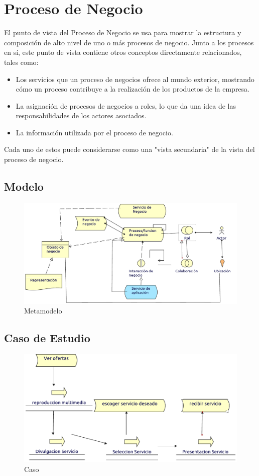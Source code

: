 \section{Proceso de Negocio}
El punto de vista del Proceso de Negocio se usa para mostrar la estructura y composición de alto nivel de uno o más procesos de negocio. Junto a los procesos en sí, este punto de vista contiene otros conceptos directamente relacionados, tales como:
\begin{itemize}
\item Los servicios que un proceso de negocios ofrece al mundo exterior, mostrando cómo un proceso contribuye a la realización de los productos de la empresa.
\item La asignación de procesos de negocios a roles, lo que da una idea de las responsabilidades de los actores asociados.
\item La información utilizada por el proceso de negocio. 
\end{itemize}
Cada uno de estos puede considerarse como una "vista secundaria" de la vista del proceso de negocio.
\subsection{Modelo}
\begin{figure}[h!]
	\centering
	\includegraphics[width=\linewidth]{Arquitectura/Negocio/imgs/ProcesoNegocioMetamodelo.pdf}
	\caption{Metamodelo}
\end{figure}
\newpage
\subsection{Caso de Estudio}

\begin{figure}[h!]
	\centering
	\includegraphics[width=\linewidth]{Arquitectura/Negocio/imgs/ProcesoNegocio.pdf}
	\caption{Caso}
\end{figure}
\newpage

